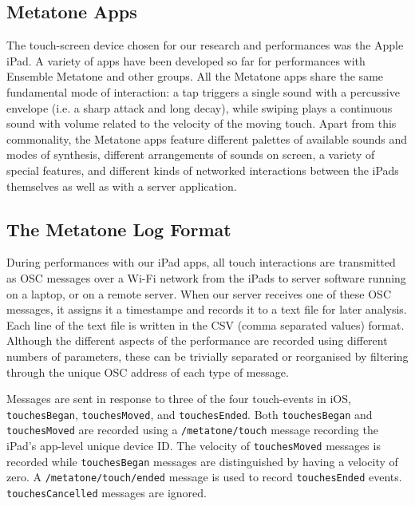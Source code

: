 \documentclass[graybox]{svmult}
\begin{document}
\subsection{Metatone Apps}
\label{subsec:metatone-apps}

The touch-screen device chosen for our research and performances was
the Apple iPad. A variety of apps have been developed so far for
performances with Ensemble Metatone and other groups. All the Metatone
apps share the same fundamental mode of interaction: a tap triggers a
single sound with a percussive envelope (i.e. a sharp attack and long
decay), while swiping plays a continuous sound with volume related to
the velocity of the moving touch. Apart from this commonality, the
Metatone apps feature different palettes of available sounds and modes
of synthesis, different arrangements of sounds on screen, a variety of
special features, and different kinds of networked interactions between
the iPads themselves as well as with a server application.

\subsection{The Metatone Log Format}
\label{subsec:metatone-log}

During performances with our iPad apps, all touch interactions are
transmitted as OSC messages over a Wi-Fi network from the iPads to
server software running on a laptop, or on a remote server. When our
server receives one of these OSC messages, it assigns it a timestampe
and records it to a text file for later analysis. Each line of the
text file is written in the CSV (comma separated values) format.
Although the different aspects of the performance are recorded using
different numbers of parameters, these can be trivially separated or
reorganised by filtering through the unique OSC address of each type
of message. 

Messages are sent in response to three of the four touch-events in
iOS, \texttt{touchesBegan}, \texttt{touchesMoved}, and
\texttt{touchesEnded}. Both \texttt{touchesBegan} and
\texttt{touchesMoved} are recorded using a \texttt{/metatone/touch}
message recording the iPad's app-level unique device ID. The velocity
of \texttt{touchesMoved} messages is recorded while
\texttt{touchesBegan} messages are distinguished by having a velocity
of zero. A \texttt{/metatone/touch/ended} message is used to record
\texttt{touchesEnded} events. \texttt{touchesCancelled} messages are
ignored.
 
\end{document}
